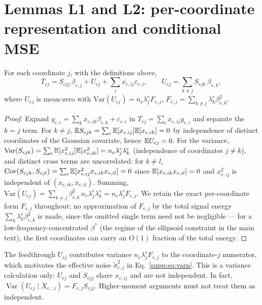 \section{Lemmas L1 and L2: per-coordinate representation and conditional MSE}
\label{supp:l12}

\begin{lemma}[L1, representation]\label{supp:l1}
For each coordinate $j$, with the definitions above,
\begin{equation}
  T_{ej} = S_{ejj}\,\beta_{e,j} + U_{ej} + \textstyle\sum_i x_{e,ij}\varepsilon_{e,i},
  \qquad U_{ej} = \sum_{k\neq j} S_{ejk}\,\beta_{e,k},
  \label{supp:eq:l1}
\end{equation}
where $U_{ej}$ is mean-zero with $\mathrm{Var}(U_{ej}) = n_e \lambda^e_j F_{e,j}$, $F_{e,j} = \sum_{k\neq j} \lambda^e_k \beta_{e,k}^2$.
\end{lemma}

\begin{proof}
Expand $y_{e,i} = \sum_k x_{e,ik}\beta_{e,k} + \varepsilon_{e,i}$ in $T_{ej} = \sum_i x_{e,ij} y_{e,i}$ and separate the $k = j$ term.
For $k \neq j$, $\mathbb{E} S_{ejk} = \sum_i \mathbb{E}[x_{e,ij}]\mathbb{E}[x_{e,ik}] = 0$ by independence of distinct coordinates of the Gaussian covariate, hence $\mathbb{E} U_{ej} = 0$.
For the variance, $\mathrm{Var}(S_{ejk}) = \sum_i \mathbb{E}[x_{e,ij}^2]\mathbb{E}[x_{e,ik}^2] = n_e \lambda^e_j \lambda^e_k$ (independence of coordinates $j \neq k$), and distinct cross terms are uncorrelated: for $k \neq l$, $\mathrm{Cov}(S_{ejk}, S_{ejl}) = \sum_i \mathbb{E}[x_{e,ij}^2 x_{e,ik} x_{e,il}] = 0$ since $\mathbb{E}[x_{e,ik}x_{e,il}] = 0$ and $x_{e,ij}^2$ is independent of $(x_{e,ik}, x_{e,il})$.
Summing, $\mathrm{Var}(U_{ej}) = \sum_{k\neq j} \beta_{e,k}^2 \, n_e \lambda^e_j \lambda^e_k = n_e \lambda^e_j F_{e,j}$.
We retain the exact per-coordinate form $F_{e,j}$ throughout; no approximation of $F_{e,j}$ by the total signal energy $\sum_k \lambda^e_k\beta_{e,k}^2$ is made, since the omitted single term need not be negligible --- for a low-frequency-concentrated $\beta^*$ (the regime of the ellipsoid constraint in the main text), the first coordinates can carry an $O(1)$ fraction of the total energy.
\end{proof}

\begin{remark}
The feedthrough $U_{ej}$ contributes variance $n_e\lambda^e_j F_{e,j}$ to the coordinate-$j$ numerator, which motivates the effective noise $\tilde\sigma_{e,j}^2$ in Eq.~\eqref{supp:eq:varn}. This is a variance calculation only: $U_{ej}$ and $S_{ejj}$ share $x_{e,ij}$ and are not independent. In fact, $\operatorname{Var}(U_{ej}\mid X_{e,:j})=F_{e,j}S_{ejj}$. Higher-moment arguments must not treat them as independent.
\end{remark}

